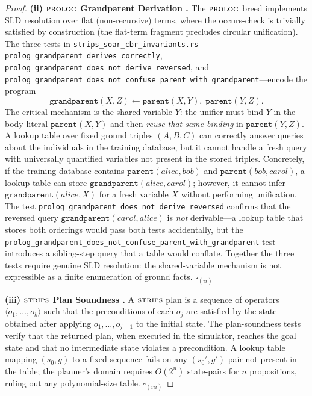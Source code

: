 \begin{proof}
\medskip\noindent
\textbf{(ii) $\textsc{prolog}$ Grandparent Derivation \cite{robinson1965,kowalski1974prolog}.}
The $\textsc{prolog}$ breed implements SLD resolution over flat (non-recursive) terms, where the occurs-check is trivially satisfied by construction (the flat-term fragment precludes circular unification).  The
three tests in \texttt{strips\_soar\_cbr\_invariants.rs}---\allowbreak
\texttt{prolog\_grandparent\_derives\_correctly},
\texttt{prolog\_grandparent\_does\_not\_derive\_reversed}, and
\texttt{prolog\_grandparent\_does\_not\_confuse\_parent\_with\_grandparent}---encode
the program
\[
  \texttt{grandparent}(X, Z) \leftarrow
    \texttt{parent}(X, Y),\; \texttt{parent}(Y, Z).
\]
The critical mechanism is the shared variable $Y$: the unifier must bind $Y$
in the body literal $\texttt{parent}(X, Y)$ and then \emph{reuse that same
binding} in $\texttt{parent}(Y, Z)$.  A lookup table over fixed ground
triples $(A, B, C)$ can correctly answer queries about the individuals in
the training database, but it cannot handle a fresh query with universally
quantified variables not present in the stored triples.  Concretely, if the
training database contains $\texttt{parent}(\mathit{alice}, \mathit{bob})$
and $\texttt{parent}(\mathit{bob}, \mathit{carol})$, a lookup table can
store $\texttt{grandparent}(\mathit{alice}, \mathit{carol})$; however, it
cannot infer $\texttt{grandparent}(\mathit{alice}, X)$ for a fresh variable
$X$ without performing unification.  The test
\texttt{prolog\_grandparent\_does\_not\_derive\_reversed} confirms that the
reversed query $\texttt{grandparent}(\mathit{carol}, \mathit{alice})$ is
\emph{not} derivable---a lookup table that stores both orderings would pass
both tests accidentally, but the
\texttt{prolog\_grandparent\_does\_not\_confuse\_parent\_with\_grandparent}
test introduces a sibling-step query that a table would conflate.  Together
the three tests require genuine SLD resolution: the shared-variable
mechanism is not expressible as a finite enumeration of ground facts.
\qquad $\square_{(ii)}$

\medskip\noindent
\textbf{(iii) $\textsc{strips}$ Plan Soundness \cite{fikes1971strips}.}
A $\textsc{strips}$ plan is a sequence of operators $\langle o_1, \ldots, o_k
\rangle$ such that the preconditions of each $o_j$ are satisfied by the
state obtained after applying $o_1, \ldots, o_{j-1}$ to the initial state.
The plan-soundness tests verify that the returned plan, when executed in the
simulator, reaches the goal state and that no intermediate state violates
a precondition.  A lookup table mapping $(s_0, g)$ to a fixed sequence
fails on any $(s_0', g')$ pair not present in the table; the planner's
domain requires $O(2^n)$ state-pairs for $n$ propositions, ruling out
any polynomial-size table.  \qquad $\square_{(iii)}$


\end{proof}
